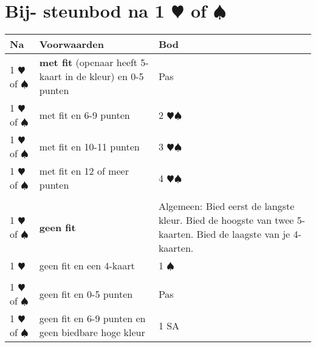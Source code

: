 \documentclass[12pt,a4paper]{report}
\begin{document}
\section{Bij- steunbod na 1 $\varheartsuit$ of $\spadesuit$ }
\begin{tabular}{|l|p{7cm}|p{6.5cm}|}
	\hline 
	\textbf{Na} &\textbf{Voorwaarden}  &\textbf{Bod}\\ 
	\hline
	
	1 $\varheartsuit$ of $ \spadesuit$ 
	&\textbf{met fit} (openaar heeft  5-kaart in de kleur) \newline 
	  en 0-5 punten
	&Pas\\ 
	\hline 
	
	1 $\varheartsuit$ of $ \spadesuit$
	& met fit \newline 
	  en 6-9 punten
	& 2 $\varheartsuit \spadesuit$  \\ 
	\hline 
	
	1 $\varheartsuit$ of $ \spadesuit$
	& met fit \newline 
	  en 10-11 punten
	& 3 $\varheartsuit \spadesuit$  \\ 
	\hline 
	
	1 $\varheartsuit$ of $ \spadesuit$
	& met fit \newline 
	  en 12 of meer punten
	& 4 $\varheartsuit \spadesuit$  \\ 
	\hline 
	
	   &  &  \\ 
	\hline 
	
	1 $\varheartsuit$ of $ \spadesuit$
	& \textbf{geen fit} 
	& Algemeen:\newline
	  Bied eerst de langste kleur. \newline
	  Bied de hoogste van twee 5-kaarten. \newline
	  Bied de laagste van je 4-kaarten. \\ 
	\hline
	
	1 $\varheartsuit$
	& geen fit\newline
	  en een 4-kaart
	& 1 $\spadesuit$\\ 
	\hline
	
	   &  &  \\ 
	\hline  
	
	1 $\varheartsuit$ of $\spadesuit$   
	& geen fit\newline
	  en 0-5 punten 
	& Pas  \\ 
	\hline 
	
	1 $\varheartsuit$ of $\spadesuit$
	& geen fit\newline
	  en 6-9 punten \newline
	  en geen biedbare hoge kleur& 1 SA \\ 
	\hline 
	

\end{tabular}
\end{document}
